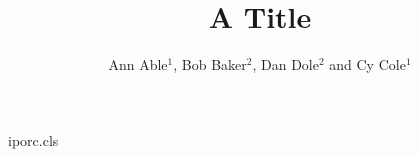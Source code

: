 \begin{filecontents*}[overwrite]{iporc.cls}
\RequirePackage{hyperref}
\renewcommand{\author}[1]{{\raggedright #1\par}}
\newcommand{\affil}[1]{{\small\raggedright #1\par}}
\newcommand{\orcid}[1]{\href{https://orcid.org/#1}{(iD)}}
\end{filecontents*}
\documentclass{iporc}

\title{A Title}
\author{Ann Able$^{1}$, Bob Baker$^{2}$, Dan Dole$^{2}$ and Cy Cole$^{1}$}


\maketitle
Text.

